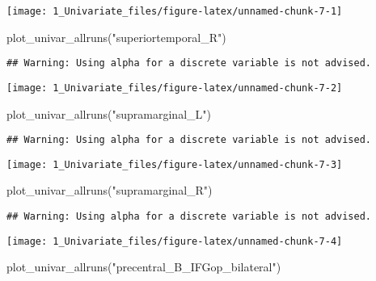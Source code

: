 \documentclass[
]{article}
\newenvironment{Shaded}{\begin{snugshade}}{\end{snugshade}}
\newcommand{\FunctionTok}[1]{\textcolor[rgb]{0.00,0.00,0.00}{#1}}
\newcommand{\NormalTok}[1]{#1}
\newcommand{\StringTok}[1]{\textcolor[rgb]{0.31,0.60,0.02}{#1}}
\begin{document}
\texttt{[image: 1\_Univariate\_files/figure-latex/unnamed-chunk-7-1]}

\begin{Shaded}
\begin{Highlighting}[]
\FunctionTok{plot\_univar\_allruns}\NormalTok{(}\StringTok{"superiortemporal\_R"}\NormalTok{)}
\end{Highlighting}
\end{Shaded}

\begin{verbatim}
## Warning: Using alpha for a discrete variable is not advised.
\end{verbatim}

\texttt{[image: 1\_Univariate\_files/figure-latex/unnamed-chunk-7-2]}

\begin{Shaded}
\begin{Highlighting}[]
\FunctionTok{plot\_univar\_allruns}\NormalTok{(}\StringTok{"supramarginal\_L"}\NormalTok{)}
\end{Highlighting}
\end{Shaded}

\begin{verbatim}
## Warning: Using alpha for a discrete variable is not advised.
\end{verbatim}

\texttt{[image: 1\_Univariate\_files/figure-latex/unnamed-chunk-7-3]}

\begin{Shaded}
\begin{Highlighting}[]
\FunctionTok{plot\_univar\_allruns}\NormalTok{(}\StringTok{"supramarginal\_R"}\NormalTok{)}
\end{Highlighting}
\end{Shaded}

\begin{verbatim}
## Warning: Using alpha for a discrete variable is not advised.
\end{verbatim}

\texttt{[image: 1\_Univariate\_files/figure-latex/unnamed-chunk-7-4]}

\begin{Shaded}
\begin{Highlighting}[]
\FunctionTok{plot\_univar\_allruns}\NormalTok{(}\StringTok{"precentral\_B\_IFGop\_bilateral"}\NormalTok{)}
\end{Highlighting}
\end{Shaded}
\end{document}
